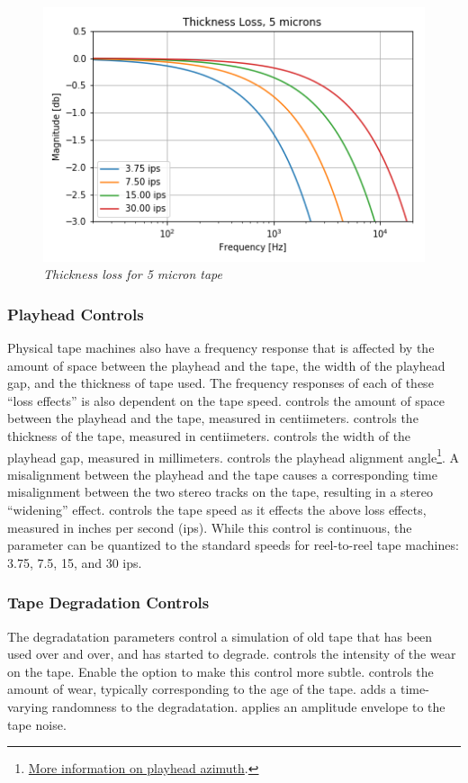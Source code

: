 \documentclass[landscape,twocolumn,a5paper]{manual}
\begin{document}
%
\begin{figure}[ht]
    \center
    \includegraphics[width=0.85\columnwidth]{../Simulations/LossEffects/speed_thickness.png}
    \caption{\label{thick_loss}{\it Thickness loss for 5 micron tape}}
\end{figure}

\subsubsection{Playhead Controls}
Physical tape machines also have a frequency response that
is affected by the amount of space between the playhead and
the tape, the width of the playhead gap, and the thickness
of tape used. The frequency responses of each of these ``loss
effects'' is also dependent on the tape speed.
\newpar
{}
controls the amount of space between the playhead and the tape,
measured in centiimeters.
\newpar
{} controls the thickness
of the tape, measured in centiimeters.
\newpar
{} controls
the width of the playhead gap, measured in millimeters.
\newpar
{}
controls the playhead alignment angle\footnote{\href{https://blog.weareavp.com/azimuth-adjustment-for-magnetic-audio-recordings}{More information on playhead azimuth}.}.
A misalignment between the playhead and the tape causes a
corresponding time misalignment between the two stereo tracks
on the tape, resulting in a stereo ``widening'' effect.
\newpar
{}
controls the tape speed as it effects the above loss effects,
measured in inches per second (ips). While this control is
continuous, the parameter can be quantized to the standard speeds
for reel-to-reel tape machines: 3.75, 7.5, 15, and 30 ips.


\subsubsection{Tape Degradation Controls}
The degradatation parameters control a simulation of
old tape that has been used over and over, and has started
to degrade.
\newline
{}
controls the intensity of the wear on the tape. Enable the
 option to make this control more subtle.
\newpar
{}
controls the amount of wear, typically corresponding to
the age of the tape.
\newpar
{}
adds a time-varying randomness to the degradatation.
\newpar
{}
applies an amplitude envelope to the tape noise.
\end{document}
